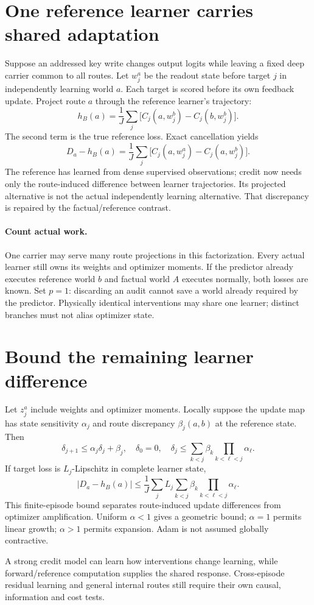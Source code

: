 \documentclass[11pt]{article}
\begin{document}
\section{One reference learner carries shared adaptation}
Suppose an addressed key write changes output logits while leaving a fixed deep carrier common to all routes. Let $w_j^a$ be the readout state before target $j$ in independently learning world $a$. Each target is scored before its own feedback update. Project route $a$ through the reference learner's trajectory:
\[
 h_B(a)=\frac1J\sum_j\big[C_j(a,w_j^b)-C_j(b,w_j^b)\big].
\]
The second term is the true reference loss. Exact cancellation yields
\[
 D_a-h_B(a)=\frac1J\sum_j\big[C_j(a,w_j^a)-C_j(a,w_j^b)\big].
\]
The reference has learned from dense supervised observations; credit now needs only the route-induced difference between learner trajectories. Its projected alternative is not the actual independently learning alternative. That discrepancy is repaired by the factual/reference contrast.

\paragraph{Count actual work.} One carrier may serve many route projections in this factorization. Every actual learner still owns its weights and optimizer moments. If the predictor already executes reference world $b$ and factual world $A$ executes normally, both losses are known. Set $p=1$: discarding an audit cannot save a world already required by the predictor. Physically identical interventions may share one learner; distinct branches must not alias optimizer state.
\section{Bound the remaining learner difference}
Let $z_j^a$ include weights and optimizer moments. Locally suppose the update map has state sensitivity $\alpha_j$ and route discrepancy $\beta_j(a,b)$ at the reference state. Then
\[
 \delta_{j+1}\le\alpha_j\delta_j+\beta_j,
 \quad\delta_0=0,\quad
 \delta_j\le\sum_{k<j}\beta_k\prod_{k<\ell<j}\alpha_\ell.
\]
If target loss is $L_j$-Lipschitz in complete learner state,
\[
 |D_a-h_B(a)|\le\frac1J\sum_jL_j\sum_{k<j}\beta_k
                                  \prod_{k<\ell<j}\alpha_\ell.
\]
This finite-episode bound separates route-induced update differences from optimizer amplification. Uniform $\alpha<1$ gives a geometric bound; $\alpha=1$ permits linear growth; $\alpha>1$ permits expansion. Adam is not assumed globally contractive.
\begin{keyidea}
A strong credit model can learn how interventions change learning, while forward/reference computation supplies the shared response. Cross-episode residual learning and general internal routes still require their own causal, information and cost tests.
\end{keyidea}
\newpage
\end{document}
